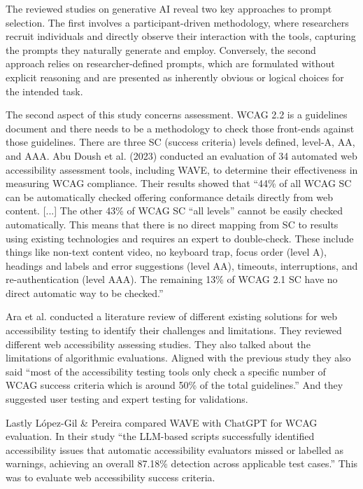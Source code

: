 \documentclass{article}
\begin{document}
The reviewed studies on generative AI reveal two key approaches to prompt selection.
The first involves a participant-driven methodology, where researchers recruit individuals and directly observe their interaction with the tools,
capturing the prompts they naturally generate and employ.
Conversely, the second approach relies on researcher-defined prompts,
which are formulated without explicit reasoning and are presented as inherently obvious or logical choices for the intended task.

The second aspect of this study concerns assessment.
WCAG 2.2 is a guidelines document and there needs to be a methodology to check those front-ends against those guidelines.
There are three SC (success criteria) levels defined, level-A, AA, and AAA.
Abu Doush et al. (2023)\cite{abu_doush_web_2023} conducted an evaluation of 34 automated web accessibility assessment tools, including WAVE,
to determine their effectiveness in measuring WCAG compliance.
Their results showed that “44\% of all WCAG SC can be automatically checked offering conformance details directly from web content.
[...] The other 43\% of WCAG SC “all levels” cannot be easily checked automatically.
This means that there is no direct mapping from SC to results using existing technologies and requires an expert to double-check.
These include things like non-text content video, no keyboard trap, focus order (level A), headings and labels
and error suggestions (level AA), timeouts, interruptions, and re-authentication (level AAA).
The remaining 13\% of WCAG 2.1 SC have no direct automatic way to be checked.” \cite{abu_doush_web_2023}

Ara et al. \cite{ara_inclusive_2024} conducted a literature review of different existing solutions for web accessibility
testing to identify their challenges and limitations.
They reviewed different web accessibility assessing studies.
They also talked about the limitations of algorithmic evaluations.
Aligned with the previous study they also said
“most of the accessibility testing tools only check a specific number of WCAG success criteria which is around 50\% of the total guidelines.”
And they suggested user testing and expert testing for validations. \cite{ara_inclusive_2024}

Lastly López-Gil \& Pereira \cite{lopez-gil_turning_2025} compared WAVE with ChatGPT for WCAG evaluation.
In their study “the LLM-based scripts successfully identified accessibility issues that automatic accessibility evaluators missed or labelled as warnings,
achieving an overall 87.18\% detection across applicable test cases.” This was to evaluate web accessibility success criteria. \cite{lopez-gil_turning_2025}
\end{document}
